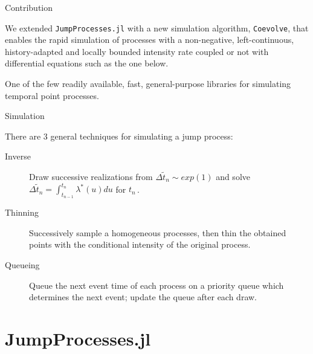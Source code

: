 \documentclass[
  ignorenonframetext,
  aspectratio=169,
  xcolor={dvipsnames,rgb}
]{beamer}
\begin{document}
\begin{frame}{Contribution}


\vspace{-3em}

We extended \texttt{JumpProcesses.jl} with a new simulation algorithm, \texttt{Coevolve}, that enables the rapid simulation of processes with a non-negative, left-continuous, history-adapted and locally bounded intensity rate coupled or not with differential equations such as the one below.

\vspace{5em}

One of the few readily available, fast, general-purpose libraries for simulating temporal point processes.

\end{frame}

\begin{frame}{Simulation}

There are 3 general techniques for simulating a jump process:

\begin{description}

  \item[Inverse] Draw successive realizations from \( \Delta \tilde{t}_n \sim exp(1) \) and solve \( \Delta \tilde{t}_n = \int_{t_{n-1}}^{t_n} \lambda^\ast (u) du \) for \( t_n \, \).

  \item[Thinning] Successively sample a homogeneous processes, then thin the obtained points with the conditional intensity of the original process.

  \item[Queueing] Queue the next event time of each process on a priority queue which determines the next event; update the queue after each draw.
  
\end{description}

\end{frame}

\hypertarget{jumpprocesses.jl}{\section{JumpProcesses.jl}\label{jumpprocesses.jl}}
\end{document}
